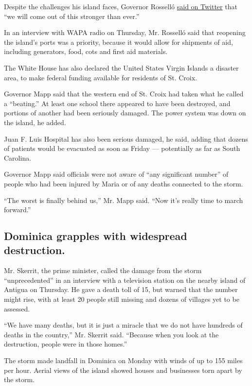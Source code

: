Despite the challenges his island faces, Governor Rosselló
\href{https://twitter.com/ricardorossello/status/910673245900361729}{said
on Twitter} that ``we will come out of this stronger than ever.''

In an interview with WAPA radio on Thursday, Mr. Rosselló said that
reopening the island's ports was a priority, because it would allow for
shipments of aid, including generators, food, cots and first aid
materials.

The White House has also declared the United States Virgin Islands a
disaster area, to make federal funding available for residents of St.
Croix.

Governor Mapp said that the western end of St. Croix had taken what he
called a ``beating.'' At least one school there appeared to have been
destroyed, and portions of another had been seriously damaged. The power
system was down on the island, he added.

Juan F. Luis Hospital has also been serious damaged, he said, adding
that dozens of patients would be evacuated as soon as Friday ---
potentially as far as South Carolina.

Governor Mapp said officials were not aware of ``any significant
number'' of people who had been injured by Maria or of any deaths
connected to the storm.

``The worst is finally behind us,'' Mr. Mapp said. ``Now it's really
time to march forward.''

\hypertarget{dominica-grapples-with-widespread-destruction}{%
\subsection{Dominica grapples with widespread
destruction.}\label{dominica-grapples-with-widespread-destruction}}

Mr. Skerrit, the prime minister, called the damage from the storm
``unprecedented'' in an interview with a television station on the
nearby island of Antigua on Thursday. He gave a death toll of 15, but
warned that the number might rise, with at least 20 people still missing
and dozens of villages yet to be assessed.

``We have many deaths, but it is just a miracle that we do not have
hundreds of deaths in the country,'' Mr. Skerrit said. ``Because when
you look at the destruction, people were in those homes.''

The storm made landfall in Dominica on Monday with winds of up to 155
miles per hour. Aerial views of the island showed houses and businesses
torn apart by the storm.

